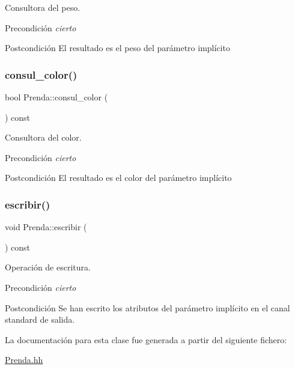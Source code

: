 Consultora del peso. 

\begin{DoxyPrecond}{Precondición}
{\itshape cierto} 
\end{DoxyPrecond}
\begin{DoxyPostcond}{Postcondición}
El resultado es el peso del parámetro implícito 
\end{DoxyPostcond}
\mbox{\label{class_prenda_a81575030ecbaabf350091f54612033f4}} 
\subsubsection{\texorpdfstring{consul\+\_\+color()}{consul\_color()}}
{\footnotesize\ttfamily bool Prenda\+::consul\+\_\+color (\begin{DoxyParamCaption}{ }\end{DoxyParamCaption}) const}



Consultora del color. 

\begin{DoxyPrecond}{Precondición}
{\itshape cierto} 
\end{DoxyPrecond}
\begin{DoxyPostcond}{Postcondición}
El resultado es el color del parámetro implícito 
\end{DoxyPostcond}
\mbox{\label{class_prenda_a6261b483bb78e47266e353fdd11c3077}} 
\subsubsection{\texorpdfstring{escribir()}{escribir()}}
{\footnotesize\ttfamily void Prenda\+::escribir (\begin{DoxyParamCaption}{ }\end{DoxyParamCaption}) const}



Operación de escritura. 

\begin{DoxyPrecond}{Precondición}
{\itshape cierto} 
\end{DoxyPrecond}
\begin{DoxyPostcond}{Postcondición}
Se han escrito los atributos del parámetro implícito en el canal standard de salida. 
\end{DoxyPostcond}


La documentación para esta clase fue generada a partir del siguiente fichero\+:\begin{DoxyCompactItemize}
\item 
\mbox{\hyperlink{_prenda_8hh}{Prenda.\+hh}}\end{DoxyCompactItemize}

